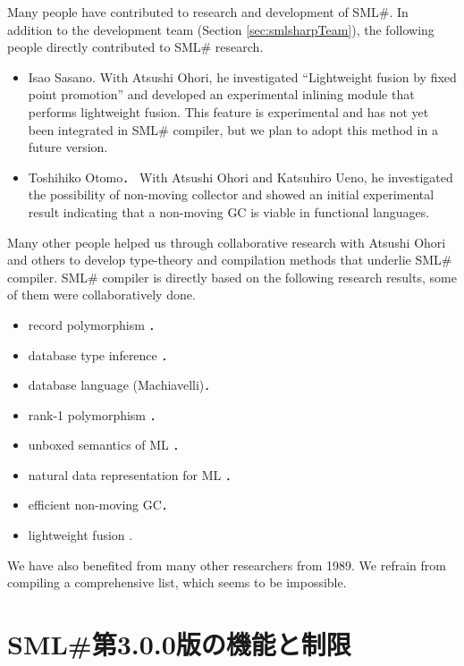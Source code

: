 \documentclass{jbook}
\newcommand{\txt}[2]{#1}
\newcommand{\smlsharp}{SML\#}
\newcommand{\version}{3.0.0}
\begin{document}
	Many people have contributed to research and development of
\smlsharp{}.
	In addition to the development team (Section
\ref{sec:smlsharpTeam}), the following people directly contributed to 
\smlsharp{} research.
\begin{itemize}
\item Isao Sasano.
With Atsushi Ohori, he investigated 
``Lightweight fusion by fixed point promotion'' and 
developed an experimental inlining module that performs lightweight
fusion.
	This feature is experimental and has not yet been integrated in
\smlsharp{} compiler, but we plan to adopt this method in a future
version.
\item Toshihiko Otomo．
	With Atsushi Ohori and Katsuhiro Ueno, he investigated the
possibility of non-moving collector and showed an initial experimental
result indicating that a non-moving GC is viable in functional
languages.
\end{itemize}
	Many other people helped us through collaborative research with
Atsushi Ohori and others to develop type-theory and compilation methods
that underlie \smlsharp{} compiler.
	\smlsharp{} compiler is directly based on the
following research results, some of them were collaboratively done.
\begin{itemize}
\item record polymorphism \cite{ohor92popl,ohor95toplas}．
\item database type inference \cite{ohor88lfp}．
\item database language (Machiavelli)\cite{ohor89sigmod,bune96tods}．
\item rank-1 polymorphism \cite{ohor99icfp}．
\item unboxed semantics of ML \cite{ohor97unbox}．
\item natural data representation for ML \cite{nguyen06ppdp}．
\item efficient non-moving GC\cite{ueno11icfp}．
\item lightweight fusion \cite{ohor07popl}.
\end{itemize}
	We have also benefited from many other researchers from 1989.
	We refrain from compiling a comprehensive list, which seems to
be impossible. 
\fi%

\section{
\txt{\smlsharp{}第\version{}版の機能と制限}
{Limitations in \smlsharp{} version \version{}}
}
\label{sec:smlsharpLimitation}
\end{document}
